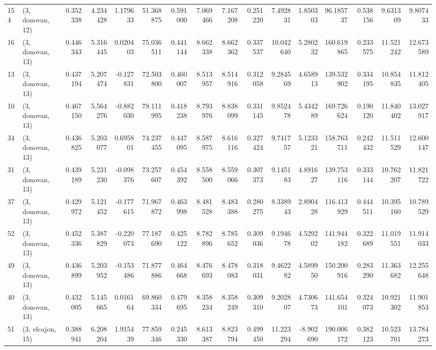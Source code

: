 \begin{tabular}{llrrrrrrrrrrrrrr}
154 &  (3, donovan, 12) &   0.352338 &   4.234428 &  1.179633 &   51.368875 &  0.591000 &   7.069466 &   7.167208 &  0.251220 &   7.492831 &   1.850303 &   96.185737 &  0.538156 &   9.631309 &   9.807433 \\
16  &  (3, donovan, 13) &   0.446343 &   5.316445 &  0.020403 &   75.036511 &  0.441144 &   8.662338 &   8.662362 &  0.337537 &  10.042640 &   5.280232 &  160.619865 &  0.233575 &  11.521242 &  12.673589 \\
13  &  (3, donovan, 13) &   0.437194 &   5.207474 & -0.127831 &   72.503800 &  0.460007 &   8.513957 &   8.514916 &  0.312058 &   9.284569 &   4.658913 &  139.532902 &  0.334195 &  10.854835 &  11.812405 \\
10  &  (3, donovan, 13) &   0.467150 &   5.564276 & -0.882030 &   78.111995 &  0.418238 &   8.793976 &   8.838099 &  0.331145 &   9.852478 &   5.434289 &  169.726624 &  0.190120 &  11.840402 &  13.027917 \\
34  &  (3, donovan, 13) &   0.436825 &   5.203077 &  0.695801 &   74.237455 &  0.447095 &   8.587975 &   8.616116 &  0.327424 &   9.741757 &   5.123321 &  158.763711 &  0.242432 &  11.511529 &  12.600147 \\
31  &  (3, donovan, 13) &   0.439189 &   5.231230 & -0.098376 &   73.257607 &  0.454392 &   8.558500 &   8.559066 &  0.307373 &   9.145183 &   4.891627 &  139.753116 &  0.333144 &  10.762207 &  11.821722 \\
37  &  (3, donovan, 13) &   0.429972 &   5.121452 & -0.177615 &   71.967872 &  0.463998 &   8.481528 &   8.483388 &  0.280275 &   8.338943 &   2.890428 &  116.413929 &  0.444511 &  10.395160 &  10.789529 \\
52  &  (3, donovan, 13) &   0.452336 &   5.387829 & -0.220073 &   77.187690 &  0.425122 &   8.782896 &   8.785652 &  0.309036 &   9.194678 &   4.529202 &  141.944182 &  0.322689 &  11.019551 &  11.914033 \\
49  &  (3, donovan, 13) &   0.436899 &   5.203952 & -0.153486 &   71.877886 &  0.464668 &   8.476693 &   8.478083 &  0.318031 &   9.462282 &   4.589950 &  150.200916 &  0.283290 &  11.363682 &  12.255648 \\
40  &  (3, donovan, 13) &   0.432005 &   5.145665 &  0.016164 &   69.860334 &  0.479695 &   8.358234 &   8.358249 &  0.309310 &   9.202807 &   4.730673 &  141.654101 &  0.324073 &  10.921302 &  11.901853 \\
51  &  (3, elcajon, 15) &   0.388941 &   6.208204 &  1.915439 &   77.859346 &  0.245330 &   8.613387 &   8.823794 &  0.499450 &  11.223294 &  -8.902690 &  190.006172 &  0.382123 &  10.523701 &  13.784273 \\

\end{tabular}
